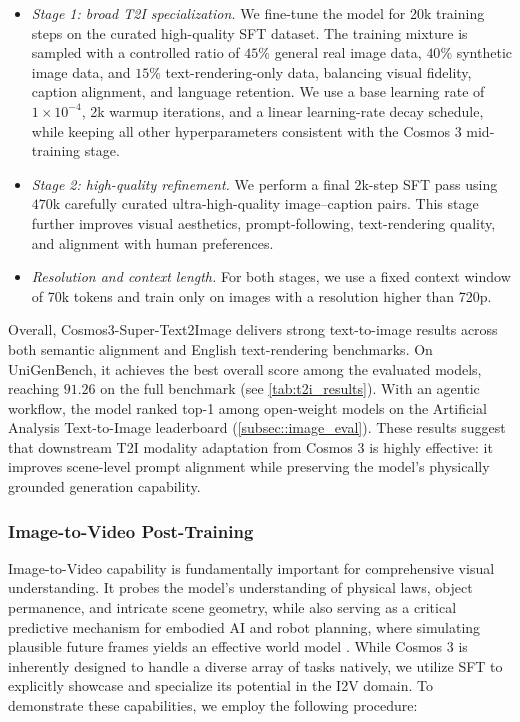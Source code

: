 \begin{itemize}
\item \textit{Stage 1: broad T2I specialization.} We fine-tune the model for 20k training steps on the curated high-quality SFT dataset. The training mixture is sampled with a controlled ratio of $45\%$ general real image data, $40\%$ synthetic image data, and $15\%$ text-rendering-only data, balancing visual fidelity, caption alignment, and language retention. We use a base learning rate of $1\times10^{-4}$, 2k warmup iterations, and a linear learning-rate decay schedule, while keeping all other hyperparameters consistent with the Cosmos 3 mid-training stage.

\item \textit{Stage 2: high-quality refinement.} We perform a final 2k-step SFT pass using $470$k carefully curated ultra-high-quality image--caption pairs. This stage further improves visual aesthetics, prompt-following, text-rendering quality, and alignment with human preferences.

\item \textit{Resolution and context length.} For both stages, we use a fixed context window of 70k tokens and train only on images with a resolution higher than 720p.
\end{itemize}

Overall, Cosmos3-Super-Text2Image delivers strong text-to-image results across both semantic alignment and English text-rendering benchmarks. On UniGenBench, it achieves the best overall score among the evaluated models, reaching $91.26$ on the full benchmark (see \cref{tab:t2i_results}). With an agentic workflow, the model ranked top-1 among open-weight models on the Artificial Analysis Text-to-Image leaderboard (\cref{subsec::image_eval}). These results suggest that downstream T2I modality adaptation from Cosmos 3 is highly effective: it improves scene-level prompt alignment while preserving the model's physically grounded generation capability.


\subsubsection{Image-to-Video Post-Training}
\label{sec::i2v_post_train}

Image-to-Video capability is fundamentally important for comprehensive visual understanding. It probes the model's understanding of physical laws, object permanence, and intricate scene geometry, while also serving as a critical predictive mechanism for embodied AI and robot planning, where simulating plausible future frames yields an effective world model \citep{wiedemer2025video, chen2025largevideoplanner}. While Cosmos 3 is inherently designed to handle a diverse array of tasks natively, we utilize SFT to explicitly showcase and specialize its potential in the I2V domain. To demonstrate these capabilities, we employ the following procedure:

